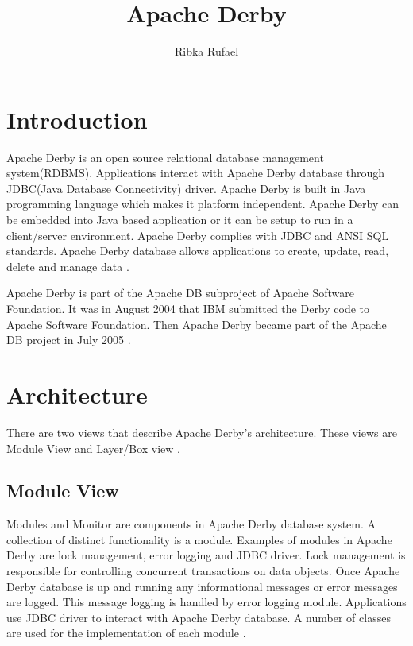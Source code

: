 \documentclass[9pt,twocolumn,twoside]{../../styles/osajnl}
\title{Apache Derby}
\author[1,*, +]{Ribka Rufael}
\affil[1]{School of Informatics and Computing, Bloomington, IN 47408, U.S.A.}
\affil[*]{Corresponding authors: rrufael@umail.iu.edu}
\affil[+]{HID: S17-IO-3016}
\begin{document}
\maketitle


\section{Introduction}

Apache Derby is an open source relational database management
system(RDBMS). Applications interact with Apache Derby database
through JDBC(Java Database Connectivity) driver. Apache Derby is built
in Java programming language which makes it platform
independent. Apache Derby can be embedded into Java based application
or it can be setup to run in a client/server environment. Apache Derby
complies with JDBC and ANSI SQL standards. Apache Derby database
allows applications to create, update, read, delete and manage data
\cite{www-derbyoverview,www-apachederbycharter}.

Apache Derby is part of the Apache DB subproject of Apache Software
Foundation. It was in August 2004 that IBM submitted the Derby code to
Apache Software Foundation. Then Apache Derby became part of the
Apache DB project in July 2005 \cite{www-apachederbycharter}.

\section{Architecture}

There are two views that describe Apache Derby's architecture. These
views are Module View and Layer/Box view \cite{www-derbyarch}.

\subsection {Module View} 

Modules and Monitor are components in Apache Derby database system. A
collection of distinct functionality is a module. Examples of modules
in Apache Derby are lock management, error logging and JDBC
driver. Lock management is responsible for controlling concurrent
transactions on data objects. Once Apache Derby database is up and
running any informational messages or error messages are logged. This
message logging is handled by error logging module.  Applications use
JDBC driver to interact with Apache Derby database. A number of
classes are used for the implementation of each module
\cite{www-derbyarch}.
\end{document}
